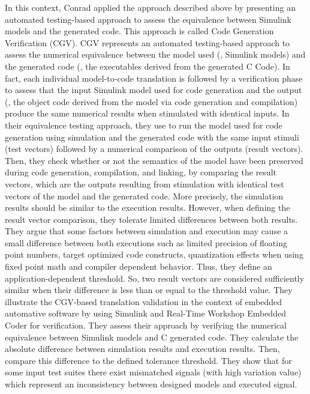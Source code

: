 In this context, Conrad \etal\cite{conrad2010code} applied the approach described above by presenting an automated testing-based approach to assess the equivalence between Simulink models and the generated code. This approach is called Code Generation Verification (CGV).
CGV represents an automated testing-based approach to assess the numerical equivalence between the model used (\ie, Simulink models) and the generated code (\ie, the executables derived from the generated C Code). 
In fact, each individual model-to-code translation is followed by a verification phase to assess that the input Simulink model used for code generation and the output (\ie, the object code derived from the model via code generation and compilation) produce the same numerical results when stimulated with identical inputs. 
In their equivalence testing approach, they use to run the model used for code generation using simulation and the generated code with the same input stimuli (test vectors) followed by a numerical comparison of the outputs (result vectors).
Then, they check whether or not the semantics of the model have been preserved during code generation, compilation, and linking, by comparing the result vectors, which are the outputs resulting from stimulation with identical test vectors of the model and the generated code.
More precisely, the simulation results should be similar to the execution results. However, when defining the result vector comparison, they tolerate limited differences between both results. They argue that some factors between simulation and execution may cause a small difference between both executions such as limited precision of floating point numbers, target optimized code constructs, quantization effects when using fixed point math and compiler dependent behavior. 
Thus, they define an application-dependent threshold. So, two result vectors are considered sufficiently similar when their difference is less than or equal to the threshold value.
They illustrate the CGV-based translation validation in the context of embedded automative software by using Simulink and Real-Time Workshop Embedded Coder for verification. They assess their approach by verifying the numerical equivalence between Simulink models and C generated code. They calculate the absolute difference between simulation results and execution results. Then,  compare this difference to the defined tolerance threshold. They show that for some input test suites there exist mismatched signals (with high variation value) which represent an inconsistency between designed models and executed signal.

